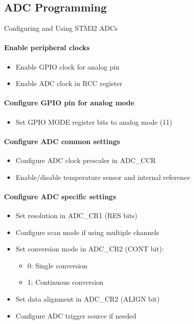\subsection{ADC Programming}

\begin{KR}{Configuring and Using STM32 ADCs}
\paragraph{Enable peripheral clocks}
\begin{itemize}
    \item Enable GPIO clock for analog pin
    \item Enable ADC clock in RCC register
\end{itemize}

\paragraph{Configure GPIO pin for analog mode}
\begin{itemize}
    \item Set GPIO MODE register bits to analog mode (11)
\end{itemize}

\paragraph{Configure ADC common settings}
\begin{itemize}
    \item Configure ADC clock prescaler in ADC\_CCR
    \item Enable/disable temperature sensor and internal reference
\end{itemize}

\paragraph{Configure ADC specific settings}
\begin{itemize}
    \item Set resolution in ADC\_CR1 (RES bits)
    \item Configure scan mode if using multiple channels
    \item Set conversion mode in ADC\_CR2 (CONT bit):
    \begin{itemize}
        \item 0: Single conversion
        \item 1: Continuous conversion
    \end{itemize}
    \item Set data alignment in ADC\_CR2 (ALIGN bit)
    \item Configure ADC trigger source if needed
\end{itemize}


\end{KR}
